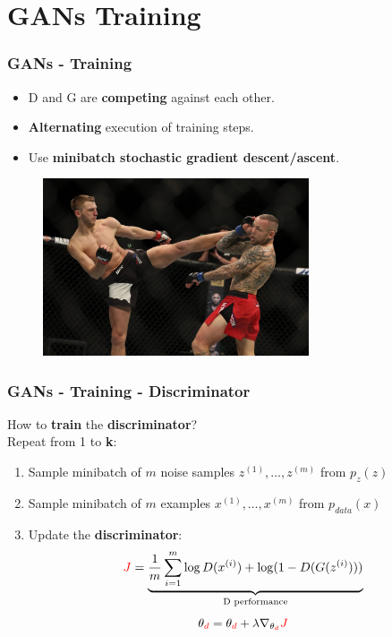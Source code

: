 \documentclass{beamer}
\begin{document}
\section{GANs Training}

\begin{frame}
	\frametitle{GANs - Training}
	\begin{itemize}
		\item D and G are \textbf{competing} against each other.
		\item \textbf{Alternating} execution of training steps.
		\item Use \textbf{minibatch stochastic gradient descent/ascent}.
	\end{itemize}
	\begin{figure}
		\centering
		\includegraphics[width=0.7\textwidth]{images/fight.jpg}
	\end{figure}
\end{frame}

\begin{frame}
	\frametitle{GANs - Training - Discriminator}
	How to \textbf{train} the \textbf{discriminator}? \\
	Repeat from 1 to \textbf{k}:
		\begin{enumerate}
			\item<1-> \alert<+>{Sample minibatch of $m$ noise samples ${z^{(1)},\dots,z^{(m)}}$ from $p_z(z)$}
			\item<2-> \alert<+>{Sample minibatch of $m$ examples ${x^{(1)},\dots,x^{(m)}}$ from $p_{data}(x)$}
			\item<3-> \alert<+>{Update the \textbf{discriminator}:
		\begin{equation*}
			\textcolor{red}{J} =  \underbrace{\frac{1}{m} \sum_{i=1}^{m} \log D(x^{(i)}) + \log(1 - D(G(z^{(i)})))}_{\text{D performance}}
		\end{equation*}
	\LARGE		
	\begin{equation*}
	\theta_{\textcolor{red}{d}} = \theta_{\textcolor{red}{d}} + \lambda \nabla_{\theta_{\textcolor{red}{d}}} \textcolor{red}{J}
	\end{equation*}	
}
		\end{enumerate}
\end{frame}
\end{document}
